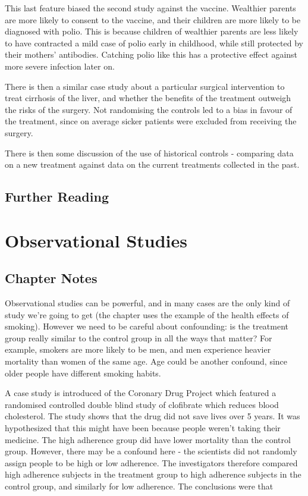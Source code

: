 \documentclass[
]{book}
\begin{document}
This last feature biased the second study against the vaccine. Wealthier parents are more likely to consent to the vaccine, and their children are more likely to be diagnosed with polio. This is because children of wealthier parents are less likely to have contracted a mild case of polio early in childhood, while still protected by their mothers' antibodies. Catching polio like this has a protective effect against more severe infection later on.

There is then a similar case study about a particular surgical intervention to treat cirrhosis of the liver, and whether the benefits of the treatment outweigh the risks of the surgery. Not randomising the controls led to a bias in favour of the treatment, since on average sicker patients were excluded from receiving the surgery.

There is then some discussion of the use of historical controls - comparing data on a new treatment against data on the current treatments collected in the past.

\hypertarget{further-reading}{%
\section*{Further Reading}\label{further-reading}}

\hypertarget{observational}{%
\chapter{Observational Studies}\label{observational}}

\hypertarget{chapter-notes-1}{%
\section{Chapter Notes}\label{chapter-notes-1}}

Observational studies can be powerful, and in many cases are the only kind of study we're going to get (the chapter uses the example of the health effects of smoking). However we need to be careful about confounding: is the treatment group really similar to the control group in all the ways that matter? For example, smokers are more likely to be men, and men experience heavier mortality than women of the same age. Age could be another confound, since older people have different smoking habits.

A case study is introduced of the Coronary Drug Project which featured a randomised controlled double blind study of clofibrate which reduces blood cholesterol. The study shows that the drug did not save lives over 5 years. It was hypothesized that this might have been because people weren't taking their medicine. The high adherence group did have lower mortality than the control group. However, there may be a confound here - the scientists did not randomly assign people to be high or low adherence. The investigators therefore compared high adherence subjects in the treatment group to high adherence subjects in the control group, and similarly for low adherence. The conclusions were that
\end{document}
